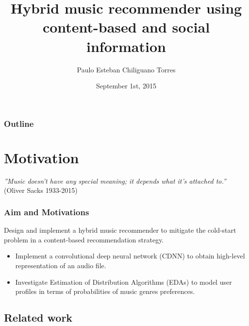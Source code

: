 \documentclass{beamer}
\title[Hybrid music recommender]{Hybrid music recommender using content-based and social information} %
\author{Paulo Esteban Chiliguano Torres} %
\institute[QMUL] %
{School of Electrical Engineering and Computer Science\\
Queen Mary University of London \\ %
\medskip
}
\date{September 1st, 2015} %
\begin{document}
\begin{frame}
\titlepage %
\end{frame}

\begin{frame}
\frametitle{Outline} %
\tableofcontents %
\end{frame}



\section{Motivation}
\begin{frame}
	\textit{''Music doesn't have any special meaning; it depends what it's attached to.''} (Oliver Sacks 1933-2015)
\end{frame}
\begin{frame}
\frametitle{Aim and Motivations}
Design and implement a hybrid music recommender to mitigate the cold-start problem in a content-based recommendation strategy. 
\begin{itemize}
\pause \item Implement a convolutional deep neural network (CDNN) to obtain high-level representation of an audio file.
\pause \item Investigate Estimation of Distribution Algorithms (EDAs) to model user profiles in terms of probabilities of music genres preferences.
\end{itemize}
\end{frame}


\subsection{Related work}
\end{document}
